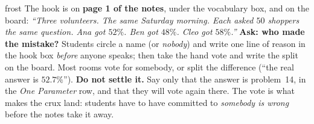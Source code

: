 \documentclass[10pt]{article}
\begin{document}
\boxguard
\begin{skillbox}{frost}
The hook is on \textbf{page 1 of the notes}, under the vocabulary box, and on the board: \textit{``Three volunteers. The same Saturday morning. Each asked $50$ shoppers the same question. Ana got $52\%$. Ben got $48\%$. Cleo got $58\%$.''} \textbf{Ask: who made the mistake?} Students circle a name (or \emph{nobody}) and write one line of reason in the hook box \emph{before} anyone speaks; then take the hand vote and write the split on the board. Most rooms vote for somebody, or split the difference (``the real answer is $52.7\%$'').
\textbf{Do not settle it.} Say only that the answer is problem~14, in the \emph{One
Parameter} row, and that they will vote again there. The vote is what makes the crux land: students have to have
committed to \emph{somebody is wrong} before the notes take it away.
\end{skillbox}
\end{document}
